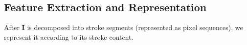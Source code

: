 
\vspace{-2mm}
\subsection{Feature Extraction and Representation} \label{subsec: featureExtraction}
\vspace{-2mm}
After $\mathbf{I}$ is decomposed into stroke segments (represented as pixel sequences), we represent it according to its stroke content.




\vspace{-2mm}

